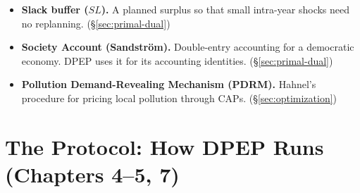 \documentclass[10pt,twoside,openany]{book}
\theoremstyle{dpepstyle}
\begin{document}
\begin{itemize}[leftmargin=1.2em,itemsep=2pt,topsep=2pt]
\item \textbf{Slack buffer ($SL$).} A planned surplus so that small intra-year shocks need no replanning. (\S\ref{sec:primal-dual})
\item \textbf{Society Account (Sandström).} Double-entry accounting for a democratic economy. DPEP uses it for its accounting identities. (\S\ref{sec:primal-dual})
\item \textbf{Pollution Demand-Revealing Mechanism (PDRM).} Hahnel's procedure for pricing local pollution through CAPs. (\S\ref{sec:optimization})
\end{itemize}


\section*{The Protocol: How DPEP Runs (Chapters 4--5, 7)}
\end{document}
